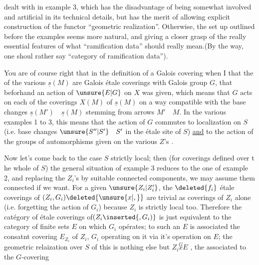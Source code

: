 dealt with in example 3, which has the disadvantage of being somewhat involved and artificial in its technical details, but has the merit of allowing explicit construction of the functor ``geometric realization''. Otherwise, the set up outlined before the examples seems more natural, and giving a closer grasp of the  really essential features of what ``ramification data'' should really mean.(By the way, one shoul rather say ``category of ramification data'').

You are of course right that in the definition of a Galois covering when I  that the  of the various $\underline{s}(M)$ are Galois étale coverings with Galois group $G$, that beforhand an action of $\unsure{E|G}$ on $X$ was given, which means that $G$ acts on each of the coverings $X(M)$ of $\underline{s}(M)$ on a way compatible with the base changes $\underline{s}(M')\quad\underline{s}(M)$ stemming from arrows  $M'\quad M$. In the various examples 1 to 3, this means that the action of $G$ commutes to  localization on $S$ (i.e. base changes $\unsure{S''|S'}\quad S'$ in the étale site of $S$) \uline{and} to the action of the groups of automorphisms given on the various $Z$'s .

Now let's come back to the case $S$ strictly local; then (for coverings defined over t he whole of $S$) the general situation of example 3 reduces to the one of example 2, and replacing the $Z_i$'s by suitable connected components, we may assume them connected if we want. For a given $\unsure{Z_i|Z_i'}$, the $\deleted{f_i}$ étale coverings of $(Z_i,G_i)\deleted{\unsure{x|,}}$ are trivial as coverings of $Z_i$ alone (i.e. forgetting the action of $G_i$) because $Z_i$ is strictly local too. Therefore the catégory of étale coverings of$(Z_i\inserted{,G_i)}$ is just equivalent to the category of finite sets $E$ on which $G_i$ opérates; to such an $E$ is associated the consatnt covering $E_{Z_i}$ of $Z_i$,  $G_i$ operating on it via it's operation on $E$; the geometric relaization over $S$ of this is nothing else but $Z_i\overset{G}{x}E$ , the  associated to the $G$-covering
